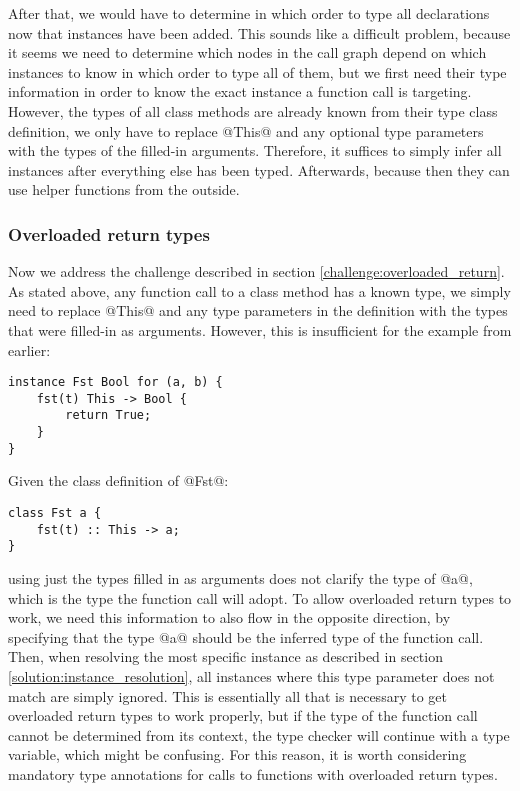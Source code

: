 After that, we would have to determine in which order to type all declarations now that instances have been added. This sounds like a difficult problem, because it seems we need to determine which nodes in the call graph depend on which instances to know in which order to type all of them, but we first need their type information in order to know the exact instance a function call is targeting. However, the types of all class methods are already known from their type class definition, we only have to replace @This@ and any optional type parameters with the types of the filled-in arguments. Therefore, it suffices to simply infer all instances after everything else has been typed. Afterwards, because then they can use helper functions from the outside.

\subsubsection{Overloaded return types}\label{solution:overloaded_return}
Now we address the challenge described in section \ref{challenge:overloaded_return}. As stated above, any function call to a class method has a known type, we simply need to replace @This@ and any type parameters in the definition with the types that were filled-in as arguments. However, this is insufficient for the example from earlier:

\begin{lstlisting}
instance Fst Bool for (a, b) {
    fst(t) This -> Bool {
        return True;
    }
}
\end{lstlisting}

Given the class definition of @Fst@:

\begin{lstlisting}
class Fst a {
    fst(t) :: This -> a;
}
\end{lstlisting}

using just the types filled in as arguments does not clarify the type of @a@, which is the type the function call will adopt. To allow overloaded return types to work, we need this information to also flow in the opposite direction, by specifying that the type @a@ should be the inferred type of the function call. Then, when resolving the most specific instance as described in section \ref{solution:instance_resolution}, all instances where this type parameter does not match are simply ignored. This is essentially all that is necessary to get overloaded return types to work properly, but if the type of the function call cannot be determined from its context, the type checker will continue with a type variable, which might be confusing. For this reason, it is worth considering mandatory type annotations for calls to functions with overloaded return types.

